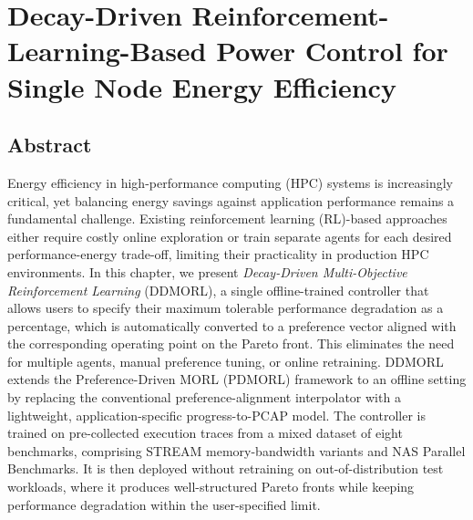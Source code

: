 

\chapter{Decay-Driven Reinforcement-Learning-Based Power Control for Single Node Energy Efficiency} \label{CH6_ICS}

\graphicspath{{Papers/ICS2026/}}
\normalsize\doublespacing

\section*{Abstract}
Energy efficiency in high-performance computing (HPC) systems is increasingly
critical, yet balancing energy savings against application performance remains a
fundamental challenge. Existing reinforcement learning (RL)-based approaches either
require costly online exploration or train separate agents for each desired
performance-energy trade-off, limiting their practicality in production HPC
environments. In this chapter, we present \textit{Decay-Driven Multi-Objective
Reinforcement Learning} (DDMORL), a single offline-trained controller that allows
users to specify their maximum tolerable performance degradation as a percentage,
which is automatically converted to a preference vector aligned with the
corresponding operating point on the Pareto front. This eliminates the need for
multiple agents, manual preference tuning, or online retraining. DDMORL extends
the Preference-Driven MORL (PDMORL) framework to an offline setting by replacing
the conventional preference-alignment interpolator with a lightweight,
application-specific progress-to-PCAP model. The controller is trained on
pre-collected execution traces from a mixed dataset of eight benchmarks, comprising
STREAM memory-bandwidth variants and NAS Parallel Benchmarks. It is then deployed
without retraining on out-of-distribution test workloads, where it produces
well-structured Pareto fronts while keeping performance degradation within the
user-specified limit.


















